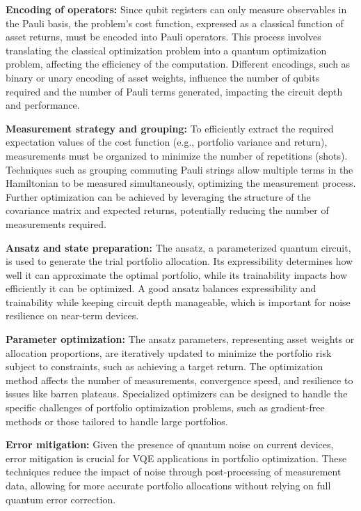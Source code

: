 \documentclass[%
 reprint,
 amsmath,amssymb,
 aps,
]{revtex4-2}
\begin{document}
\textbf{Encoding of operators:} Since qubit registers can only measure observables in the Pauli basis, the problem's cost function, expressed as a classical function of asset returns, must be encoded into Pauli operators. This process involves translating the classical optimization problem into a quantum optimization problem, affecting the efficiency of the computation. Different encodings, such as binary or unary encoding of asset weights, influence the number of qubits required and the number of Pauli terms generated, impacting the circuit depth and performance.

\textbf{Measurement strategy and grouping:} To efficiently extract the required expectation values of the cost function (e.g., portfolio variance and return), measurements must be organized to minimize the number of repetitions (shots). Techniques such as grouping commuting Pauli strings allow multiple terms in the Hamiltonian to be measured simultaneously, optimizing the measurement process. Further optimization can be achieved by leveraging the structure of the covariance matrix and expected returns, potentially reducing the number of measurements required.

\textbf{Ansatz and state preparation:} The ansatz, a parameterized quantum circuit, is used to generate the trial portfolio allocation. Its expressibility determines how well it can approximate the optimal portfolio, while its trainability impacts how efficiently it can be optimized. A good ansatz balances expressibility and trainability while keeping circuit depth manageable, which is important for noise resilience on near-term devices.

\textbf{Parameter optimization:} The ansatz parameters, representing asset weights or allocation proportions, are iteratively updated to minimize the portfolio risk subject to constraints, such as achieving a target return. The optimization method affects the number of measurements, convergence speed, and resilience to issues like barren plateaus. Specialized optimizers can be designed to handle the specific challenges of portfolio optimization problems, such as gradient-free methods or those tailored to handle large portfolios.

\textbf{Error mitigation:} Given the presence of quantum noise on current devices, error mitigation is crucial for VQE applications in portfolio optimization. These techniques reduce the impact of noise through post-processing of measurement data, allowing for more accurate portfolio allocations without relying on full quantum error correction.
\end{document}
